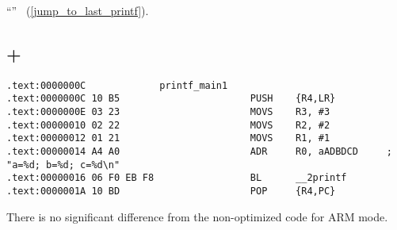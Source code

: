 ``\SwitchCaseDefaultSectionName'' 
~(\ref{jump_to_last_printf}).

\subsection{\OptimizingKeil + \ThumbMode}

\begin{lstlisting}[caption=\OptimizingKeil + \ThumbMode]
.text:0000000C             printf_main1
.text:0000000C 10 B5                       PUSH    {R4,LR}
.text:0000000E 03 23                       MOVS    R3, #3
.text:00000010 02 22                       MOVS    R2, #2
.text:00000012 01 21                       MOVS    R1, #1
.text:00000014 A4 A0                       ADR     R0, aADBDCD     ; "a=%d; b=%d; c=%d\n"
.text:00000016 06 F0 EB F8                 BL      __2printf
.text:0000001A 10 BD                       POP     {R4,PC}
\end{lstlisting}

{There is no significant difference from the non-optimized code for ARM mode}.


